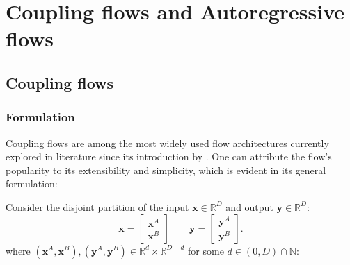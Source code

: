 \section{Coupling flows and Autoregressive flows}
\subsection{Coupling flows}
\subsubsection{Formulation}
Coupling flows are among the most widely used flow architectures currently
explored in literature since its introduction by
\citep{dinhNICENonlinearIndependent2015}. One can attribute the flow's popularity
to its extensibility and simplicity, which is evident in its general
formulation:

Consider the disjoint partition of the input $\mathbf{x} \in
\mathbb{R}^D$ and output $\mathbf{y} \in  \mathbb{R}^D$:
$$
  \mathbf{x} = \begin{bmatrix}
    \mathbf{x}^A \\
    \mathbf{x}^B
  \end{bmatrix} \quad \quad
  \mathbf{y} = \begin{bmatrix}
    \mathbf{y}^A \\
    \mathbf{y}^B
  \end{bmatrix}
.$$
where $(\mathbf{x}^A, \mathbf{x}^B), (\mathbf{y}^A, \mathbf{y}^B)   \in
\mathbb{R}^d \times \mathbb{R}^{D-d}$ for some $d \in (0, D)
\cap \mathbb{N}$:

